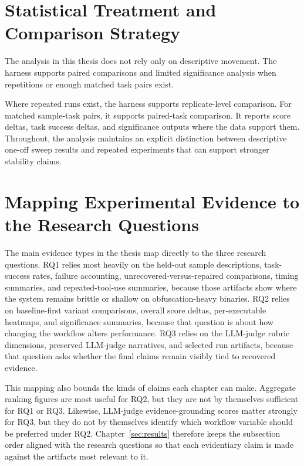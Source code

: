 \section{Statistical Treatment and Comparison Strategy}

The analysis in this thesis does not rely only on descriptive movement. The harness supports paired comparisons and limited significance analysis when repetitions or enough matched task pairs exist.

Where repeated runs exist, the harness supports replicate-level comparison. For matched sample-task pairs, it supports paired-task comparison. It reports score deltas, task success deltas, and significance outputs where the data support them. Throughout, the analysis maintains an explicit distinction between descriptive one-off sweep results and repeated experiments that can support stronger stability claims.

\section{Mapping Experimental Evidence to the Research Questions}

The main evidence types in the thesis map directly to the three research questions. RQ1 relies most heavily on the held-out sample descriptions, task-success rates, failure accounting, unrecovered-versus-repaired comparisons, timing summaries, and repeated-tool-use summaries, because those artifacts show where the system remains brittle or shallow on obfuscation-heavy binaries. RQ2 relies on baseline-first variant comparisons, overall score deltas, per-executable heatmaps, and significance summaries, because that question is about how changing the workflow alters performance. RQ3 relies on the LLM-judge rubric dimensions, preserved LLM-judge narratives, and selected run artifacts, because that question asks whether the final claims remain visibly tied to recovered evidence.

This mapping also bounds the kinds of claims each chapter can make. Aggregate ranking figures are most useful for RQ2, but they are not by themselves sufficient for RQ1 or RQ3. Likewise, LLM-judge evidence-grounding scores matter strongly for RQ3, but they do not by themselves identify which workflow variable should be preferred under RQ2. Chapter~\ref{sec:results} therefore keeps the subsection order aligned with the research questions so that each evidentiary claim is made against the artifacts most relevant to it.

